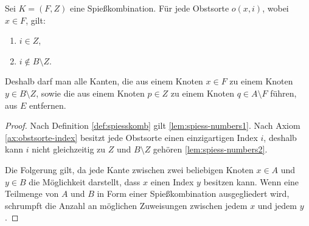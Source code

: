 \begin{lemma} \label{lem:spiess-numbers}
Sei $K = (F, Z)$ eine Spießkombination. Für jede Obstsorte $o(x, i)$, wobei $x \in F$, gilt:
\begin{enumerate}[label={\upshape(\roman*)}]
  \item $i \in Z$, \label{lem:spiess-numbers1}
  \item $i \notin B \setminus Z$. \label{lem:spiess-numbers2}
\end{enumerate}   
Deshalb darf man alle Kanten, die aus einem Knoten $x \in F$ 
zu einem Knoten $y \in B \setminus Z$, sowie die aus einem Knoten $p \in Z$ zu
einem Knoten $q \in A \setminus F$ führen, aus $E$ entfernen.
\end{lemma}

\begin{proof}
Nach Definition \ref{def:spiesskomb} gilt \ref{lem:spiess-numbers1}. 
Nach Axiom \ref{ax:obstsorte-index} besitzt jede Obstsorte einen einzigartigen Index $i$,
deshalb kann $i$ nicht gleichzeitig zu $Z$ und $B \setminus Z$ gehören \ref{lem:spiess-numbers2}.

Die Folgerung gilt, da %
jede Kante zwischen zwei beliebigen Knoten $x \in A$ und $y \in B$ die Möglichkeit darstellt,
dass $x$ einen Index $y$ besitzen kann.
Wenn eine Teilmenge von $A$ und $B$ in Form einer Spießkombination ausgegliedert wird,
schrumpft die Anzahl an möglichen Zuweisungen zwischen jedem $x$ und jedem $y$. 
\end{proof}